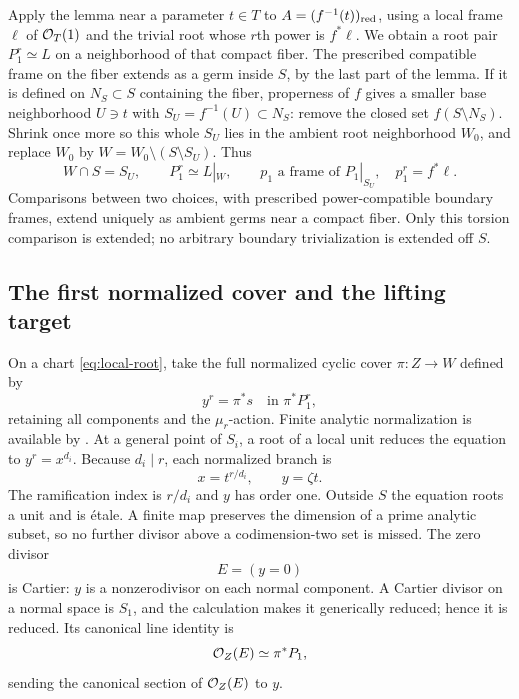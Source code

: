 Apply the lemma near a parameter \(t\in T\) to
\(A=(f^{-1}(t))_{\mathrm{red}}\), using a local frame \(\ell\) of \(\mathcal O_T(1)\)
and the trivial root whose \(r\)th power is \(f^*\ell\).  We obtain a
root pair \(P_1^r\simeq L\) on a neighborhood of that compact fiber.
The prescribed compatible frame on the fiber extends as a germ inside
\(S\), by the last part of the lemma.  If it is defined on
\(N_S\subset S\) containing the fiber, properness of \(f\) gives a
smaller base neighborhood \(U\ni t\) with \(S_U=f^{-1}(U)\subset N_S\):
remove the closed set \(f(S\setminus N_S)\).  Shrink once more so this
whole \(S_U\) lies in the ambient root neighborhood \(W_0\), and replace
\(W_0\) by \(W=W_0\setminus(S\setminus S_U)\).  Thus
\begin{equation}\label{eq:local-root}
 W\cap S=S_U,\qquad P_1^r\simeq L|_W,\qquad
 p_1\text{ a frame of }P_1|_{S_U},\quad p_1^r=f^*\ell.
\end{equation}
Comparisons between two choices, with prescribed power-compatible
boundary frames, extend uniquely as ambient germs near a compact fiber.
Only this torsion comparison is extended; no arbitrary boundary
trivialization is extended off \(S\).

\subsection{The first normalized cover and the lifting target}

On a chart \eqref{eq:local-root}, take the full normalized cyclic cover
\(\pi:Z\to W\) defined by
\[
 y^r=\pi^*s\quad\text{in }\pi^*P_1^r,
\]
retaining all components and the \(\mu_r\)-action.  Finite analytic
normalization is available by
\cite[Part~B, Section~4, Corollaries~2--3]{Houzel1961}.  At a general point of
\(S_i\), a root of a local unit reduces the equation to \(y^r=x^{d_i}\).
Because \(d_i\mid r\), each normalized branch is
\[
 x=t^{r/d_i},\qquad y=\zeta t.
\]
The ramification index is \(r/d_i\) and \(y\) has order one.  Outside
\(S\) the equation roots a unit and is \'etale.  A finite map preserves
the dimension of a prime analytic subset, so no further divisor above a
codimension-two set is missed.  The zero divisor
\[
 E=(y=0)
\]
is Cartier: \(y\) is a nonzerodivisor on each normal component.  A Cartier
divisor on a normal space is \(S_1\), and the calculation makes it
generically reduced; hence it is reduced.  Its canonical line identity is
\begin{equation}\label{eq:cover-line}
 \mathcal O_Z(E)\simeq\pi^*P_1,
\end{equation}
sending the canonical section of \(\mathcal O_Z(E)\) to \(y\).

